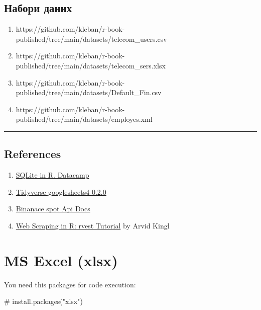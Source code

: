 \documentclass[
  letterpaper,
  DIV=11,
  numbers=noendperiod]{scrreprt}
\newenvironment{Shaded}{\begin{snugshade}}{\end{snugshade}}
\newcommand{\CommentTok}[1]{\textcolor[rgb]{0.37,0.37,0.37}{#1}}
\providecommand{\tightlist}{%
  \setlength{\itemsep}{0pt}\setlength{\parskip}{0pt}}\usepackage{longtable,booktabs,array}
\begin{document}
\section{Набори
даних}\label{ux43dux430ux431ux43eux440ux438-ux434ux430ux43dux438ux445}

\begin{enumerate}
\def\labelenumi{\arabic{enumi}.}
\tightlist
\item
  https://github.com/kleban/r-book-published/tree/main/datasets/telecom\_users.csv
\item
  https://github.com/kleban/r-book-published/tree/main/datasets/telecom\_sers.xlsx
\item
  https://github.com/kleban/r-book-published/tree/main/datasets/Default\_Fin.csv
\item
  https://github.com/kleban/r-book-published/tree/main/datasets/employes.xml
\end{enumerate}

\begin{center}\rule{0.5\linewidth}{0.5pt}\end{center}

\section{References}\label{references}

\begin{enumerate}
\def\labelenumi{\arabic{enumi}.}
\tightlist
\item
  \href{https://www.datacamp.com/community/tutorials/sqlite-in-r}{SQLite
  in R. Datacamp}
\item
  \href{https://www.tidyverse.org/blog/2020/05/googlesheets4-0-2-0/}{Tidyverse
  googlesheets4 0.2.0}
\item
  \href{https://github.com/binance/binance-spot-api-docs/blob/master/rest-api.md\#klinecandlestick-data}{Binanace
  spot Api Docs}
\item
  \href{https://www.datacamp.com/community/tutorials/r-web-scraping-rvest}{Web
  Scraping in R: rvest Tutorial} by Arvid Kingl
\end{enumerate}

\chapter{MS Excel (xlsx)}\label{ms-excel-xlsx}

You need this packages for code execution:

\begin{Shaded}
\begin{Highlighting}[]
\CommentTok{\# install.packages("xlsx")}
\end{Highlighting}
\end{Shaded}
\end{document}
